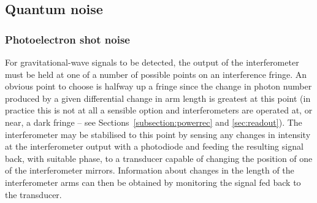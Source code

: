 \documentclass{article}
\begin{document}

\subsection{Quantum noise}
\label{subsection:quantumnoise}

\subsubsection{Photoelectron shot noise}
\label{subsubsection:shotnoise}

For gravitational-wave signals to be detected, the output of the interferometer
must be held at one of a number of possible points on an interference fringe. An
obvious point to choose is halfway up a fringe since the change in photon number
produced by a given differential change in arm length is greatest at this
point (in practice this is not at all a sensible option and interferometers
are operated at, or near, a dark fringe -- see
Sections~\ref{subsection:powerrec} and \ref{sec:readout}). The
interferometer may be stabilised to this point by sensing any changes
in intensity at the interferometer output with a photodiode and
feeding the resulting signal back, with suitable phase, to a
transducer capable of changing the position of one of the
interferometer mirrors.  Information about changes in the length of
the interferometer arms can then be obtained by monitoring the signal
fed back to the transducer.
\end{document}
